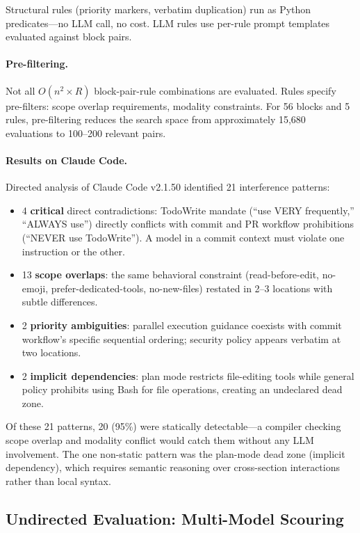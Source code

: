 \documentclass[11pt,a4paper]{article}
\begin{document}
Structural rules (priority markers, verbatim duplication) run as Python
predicates---no LLM call, no cost. LLM rules use per-rule prompt
templates evaluated against block pairs.

\paragraph{Pre-filtering.} Not all $O(n^2 \times R)$ block-pair-rule
combinations are evaluated. Rules specify pre-filters: scope overlap
requirements, modality constraints. For 56 blocks and 5 rules,
pre-filtering reduces the search space from approximately 15{,}680
evaluations to 100--200 relevant pairs.

\paragraph{Results on Claude Code.} Directed analysis of Claude Code
v2.1.50 identified 21 interference patterns:

\begin{itemize}[leftmargin=*]
  \item 4 \textbf{critical} direct contradictions: TodoWrite mandate
    (``use VERY frequently,'' ``ALWAYS use'') directly conflicts with
    commit and PR workflow prohibitions (``NEVER use TodoWrite''). A
    model in a commit context must violate one instruction or the other.
  \item 13 \textbf{scope overlaps}: the same behavioral constraint
    (read-before-edit, no-emoji, prefer-dedicated-tools, no-new-files)
    restated in 2--3 locations with subtle differences.
  \item 2 \textbf{priority ambiguities}: parallel execution guidance
    coexists with commit workflow's specific sequential ordering;
    security policy appears verbatim at two locations.
  \item 2 \textbf{implicit dependencies}: plan mode restricts
    file-editing tools while general policy prohibits using Bash for
    file operations, creating an undeclared dead zone.
\end{itemize}

Of these 21 patterns, 20 (95\%) were statically detectable---a
compiler checking scope overlap and modality conflict would catch them
without any LLM involvement. The one non-static pattern was the
plan-mode dead zone (implicit dependency), which requires semantic
reasoning over cross-section interactions rather than local syntax.


\subsection{Undirected Evaluation: Multi-Model Scouring}
\label{sec:scouring}
\end{document}
